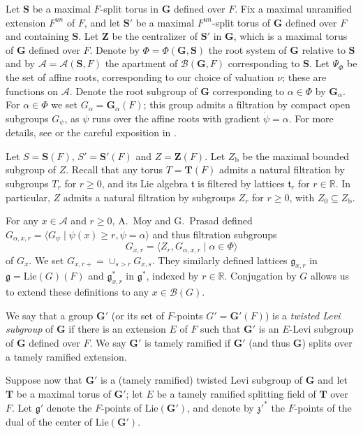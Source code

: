 \documentclass[12pt]{amsart}
\newcommand{\Zb}{Z_{\mathrm{b}}}
\newcommand{\ratk}{F}
\newcommand{\extk}{E}
\newcommand{\unk}{F^{un}}
\newcommand{\GG}{\mathbf{G}} %
\newcommand{\LieG}{\mathfrak{g}}
\newcommand{\mz}{\mathfrak{z}}
\newcommand{\Lie}{\mathrm{Lie}}
\newcommand{\TT}{\mathbf{T}} %
\newcommand{\Stor}{\mathbf{S}} %
\newcommand{\Ztor}{\mathbf{Z}} %
\newcommand{\LieT}{\mathfrak{t}}
\newcommand{\apart}{{\mathcal{A}}}
\newcommand{\buil}{\mathcal{B}}
\theoremstyle{plain}
\theoremstyle{definition}
\theoremstyle{remark}
\numberwithin{equation}{section}
\numberwithin{figure}{section}
\begin{document}
Let $\Stor$ be a maximal $\ratk$-split torus in $\GG$ defined over $\ratk$.  Fix a maximal unramified extension $\unk$ of $\ratk$, and let $\Stor'$ be a maximal $\unk$-split torus of $\GG$ defined over $\ratk$ and containing $\Stor$.  Let $\Ztor$ be the centralizer of $\Stor'$ in $\GG$, which is a maximal torus of $\GG$ defined over $\ratk$.
  Denote by $\Phi = \Phi(\GG,\Stor)$ the root system of $\GG$ relative to $\Stor$ and by $\apart = \apart(\Stor, \ratk)$ the apartment of $\buil(\GG,\ratk)$ corresponding to $\Stor$.   Let $\Psi_\Phi$ be the set of affine roots, corresponding to our choice of valuation $\nu$; these are functions on $\apart$. 
Denote the root subgroup of $\GG$ corresponding to $\alpha \in \Phi$ by $\GG_\alpha$.   For $\alpha \in \Phi$ we set $G_\alpha=\GG_{\alpha}(\ratk)$; this group admits a filtration by compact open subgroups $G_\psi$, as $\psi$ runs over the affine roots with gradient $\dot\psi=\alpha$.  For more details, see \cite[\S 4]{BruhatTits1984} or the careful exposition in \cite[\S 2]{Fintzen2015}.
 
 Let $S=\Stor(\ratk)$, $S'=\Stor'(\ratk)$ and $Z=\Ztor(\ratk)$.  Let $\Zb$ be the maximal bounded subgroup of $Z$.   Recall that any torus $T=\TT(\ratk)$ admits a natural filtration by subgroups $T_r$ for $r\geq 0$, and its Lie algebra $\LieT$ is filtered by lattices $\LieT_r$ for $r\in \mathbb{R}$.  In particular, $Z$ admits a natural filtration by subgroups $Z_{r}$ for $r\geq 0$, with $Z_0\subseteq \Zb$. 
 
 For any $x\in \apart$ and $r\geq 0$, A.~Moy and G.~Prasad \cite{MoyPrasad1994} defined $G_{\alpha,x,r} = \langle G_\psi \mid \psi(x)\geq r, \dot\psi=\alpha \rangle$ and thus filtration subgroups
 $$
 G_{x,r}=\langle Z_{r}, G_{\alpha,x,r} \mid \alpha \in \Phi\rangle 
  $$
  of $G_x$.
We set $G_{x,r+} = \cup_{s>r}G_{x,s}$.  They similarly defined lattices $\LieG_{x,r}$ in $\LieG=\Lie(G)(\ratk)$ and $\LieG^*_{x,r}$ in  $\LieG^*$, indexed by $r\in \mathbb{R}$.  Conjugation by $G$ allows us to extend these definitions to any $x\in \buil(G)$.
  
We say that a group $\GG'$ (or its set of $\ratk$-points $G' = \GG'(\ratk)$) is a \emph{twisted Levi subgroup} of $\GG$ if there is an extension $\extk$ of $\ratk$ such that  $\GG'$ is an $\extk$-Levi subgroup of $\GG$ defined over $\ratk$.   We say $\GG'$ is tamely ramified if $\GG'$ (and thus $\GG$) splits over a tamely ramified extension.  


Suppose now that $\GG'$ is a (tamely ramified) twisted Levi subgroup of $\GG$ and let $\TT$ be a maximal torus of $\GG'$; let $\extk$ be a tamely ramified splitting field of $\TT$ over $\ratk$.
Let $\LieG'$ denote the $\ratk$-points of $\Lie(\GG')$, and denote by ${\mz'}^*$ the $\ratk$-points of the dual of the center of $\Lie(\GG')$.
\end{document}
